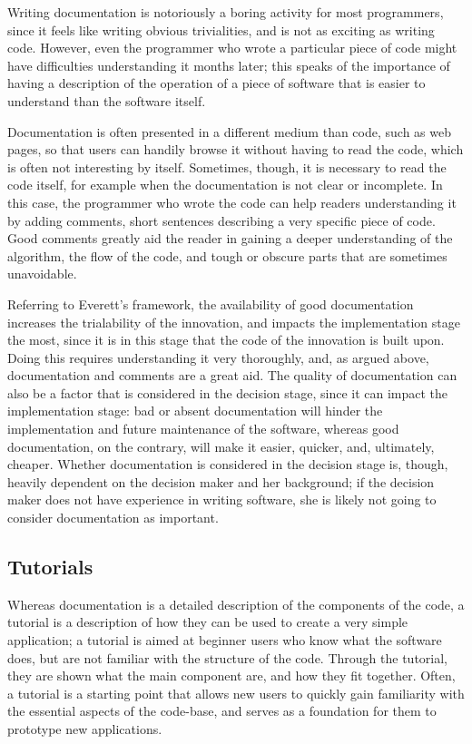 \documentclass[12pt]{article}
\begin{document}
Writing documentation is notoriously a boring activity for most programmers, since it feels like writing obvious trivialities, and is not as exciting as writing code. However, even the programmer who wrote a particular piece of code might have difficulties understanding it months later; this speaks of the importance of having a description of the operation of a piece of software that is easier to understand than the software itself.

Documentation is often presented in a different medium than code, such as web pages, so that users can handily browse it without having to read the code, which is often not interesting by itself. Sometimes, though, it is necessary to read the code itself, for example when the documentation is not clear or incomplete. In this case, the programmer who wrote the code can help readers understanding it by adding comments, short sentences describing a very specific piece of code. Good comments greatly aid the reader in gaining a deeper understanding of the algorithm, the flow of the code, and tough or obscure parts that are sometimes unavoidable.

Referring to Everett's framework, the availability of good documentation increases the trialability of the innovation, and impacts the implementation stage the most, since it is in this stage that the code of the innovation is built upon. Doing this requires understanding it very thoroughly, and, as argued above, documentation and comments are a great aid. The quality of documentation can also be a factor that is considered in the decision stage, since it can impact the implementation stage: bad or absent documentation will hinder the implementation and future maintenance of the software, whereas good documentation, on the contrary, will make it easier, quicker, and, ultimately, cheaper. Whether documentation is considered in the decision stage is, though, heavily dependent on the decision maker and her background; if the decision maker does not have experience in writing software, she is likely not going to consider documentation as important.

\subsection{Tutorials}
\label{sec:orgb72a19c}
Whereas documentation is a detailed description of the components of the code, a tutorial is a description of how they can be used to create a very simple application; a tutorial is aimed at beginner users who know what the software does, but are not familiar with the structure of the code. Through the tutorial, they are shown what the main component are, and how they fit together. Often, a tutorial is a starting point that allows new users to quickly gain familiarity with the essential aspects of the code-base, and serves as a foundation for them to prototype new applications.
\end{document}
